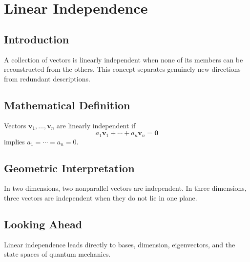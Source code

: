 \section{Linear Independence}
\label{sec:linear-independence}
\subsection{Introduction}
A collection of vectors is linearly independent when none of its members can be reconstructed from the others. This concept separates genuinely new directions from redundant descriptions.
\subsection{Mathematical Definition}
Vectors $\mathbf v_1,\ldots,\mathbf v_n$ are linearly independent if
\[
a_1\mathbf v_1+\cdots+a_n\mathbf v_n=\mathbf 0
\]
implies $a_1=\cdots=a_n=0$.
\subsection{Geometric Interpretation}
In two dimensions, two nonparallel vectors are independent. In three dimensions, three vectors are independent when they do not lie in one plane.
\subsection{Looking Ahead}
Linear independence leads directly to bases, dimension, eigenvectors, and the state spaces of quantum mechanics.
